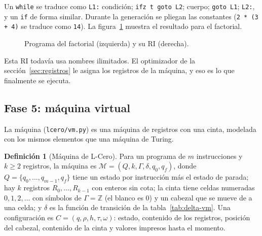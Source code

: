 \documentclass[11pt,a4paper]{article}
\theoremstyle{definition}
\newtheorem{definicion}{Definición}
\newcommand{\tm}[1]{\texttt{#1}}
\begin{document}
Un \tm{while} se traduce como \tm{L1:} condición; \tm{ifz t goto L2};
cuerpo; \tm{goto L1}; \tm{L2:}, y un \tm{if} de forma similar. Durante la
generación se pliegan las constantes (\tm{2 * (3 + 4)} se traduce como
\tm{14}). La figura~\ref{fig:ri} muestra el resultado para el factorial.

\begin{figure}[H]
\centering
\begin{minipage}[t]{0.42\textwidth}
\end{minipage}\hspace{1cm}
\begin{minipage}[t]{0.42\textwidth}
\end{minipage}
\caption{Programa del factorial (izquierda) y su RI (derecha).}
\label{fig:ri}
\end{figure}

Esta RI todavía usa nombres ilimitados. El optimizador de la
sección~\ref{sec:registros} le asigna los registros de la máquina, y eso es
lo que finalmente se ejecuta.

\subsection{Fase 5: máquina virtual}
\label{sec:maquina}

La máquina (\tm{lcero/vm.py}) es una máquina de registros con una cinta,
modelada con los mismos elementos que una máquina de Turing.

\begin{definicion}[Máquina de L-Cero]
Para un programa de $m$ instrucciones y $k \ge 2$ registros, la máquina es
$\mathcal{M} = (Q, k, \Gamma, \delta, q_0, q_f)$, donde
$Q = \{q_0, \dots, q_{m-1}, q_f\}$ tiene un estado por instrucción más el
estado de parada; hay $k$ registros $R_0, \dots, R_{k-1}$ con enteros sin
cota; la cinta tiene celdas numeradas $0, 1, 2, \dots$ con símbolos de
$\Gamma = \mathbb{Z}$ (el blanco es 0) y un cabezal que se mueve de a una
celda; y $\delta$ es la función de transición de la tabla~\ref{tab:delta-vm}.
Una configuración es $C = (q, \rho, h, \tau, \omega)$: estado, contenido de
los registros, posición del cabezal, contenido de la cinta y valores
impresos hasta el momento.
\end{definicion}
\end{document}
